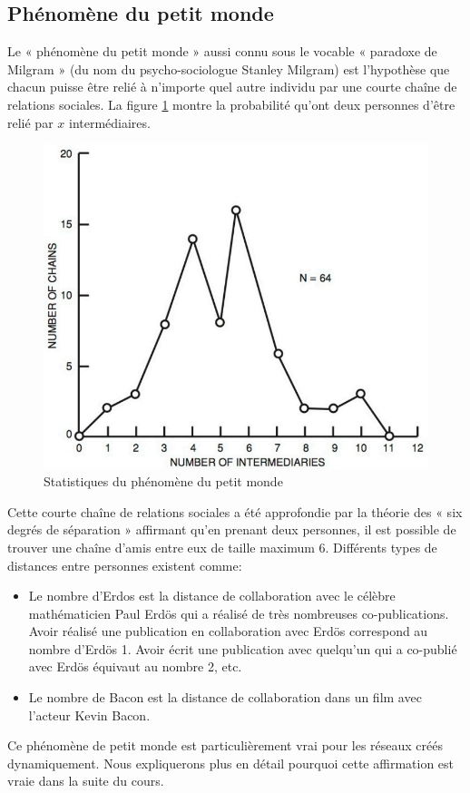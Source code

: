 \subsection{Phénomène du petit monde}
Le « phénomène du petit monde » aussi connu sous le vocable « paradoxe de Milgram » (du nom du psycho-sociologue Stanley Milgram) est l'hypothèse que chacun puisse être relié à n'importe quel autre individu par une courte chaîne de relations sociales. La figure \ref{petit_monde} montre la probabilité qu'ont deux personnes d'être relié par $x$ intermédiaires. 
	\begin{figure}
	\center
	\includegraphics[scale=1]{images/18_fig.png}
	\caption{\label{petit_monde} Statistiques du phénomène du petit monde}
	\end{figure}
Cette  courte chaîne de relations sociales a été approfondie par la théorie des « six degrés de séparation » affirmant qu'en prenant deux personnes, il est possible de trouver une chaîne d'amis entre eux de taille maximum 6.
Différents types de distances entre personnes existent comme:
	\begin{itemize}
	\item Le nombre d'Erdos est la distance de collaboration avec le célèbre mathématicien Paul Erdös qui a réalisé de très nombreuses co-publications. Avoir réalisé une publication en collaboration avec Erdös correspond au nombre d'Erdös 1. Avoir écrit une publication avec quelqu'un qui a co-publié avec Erdös équivaut au nombre 2, etc.
	\item Le nombre de Bacon est la distance de collaboration dans un film avec l'acteur Kevin Bacon.
	\end{itemize}
Ce phénomène de petit monde est particulièrement vrai pour les réseaux créés dynamiquement. Nous expliquerons plus en détail pourquoi cette affirmation est vraie dans la suite du cours.

